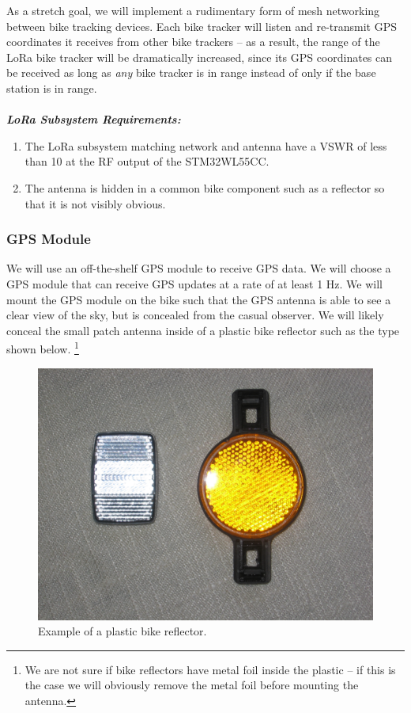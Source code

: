 \documentclass{article}
\begin{document}
As a stretch goal, we will implement a rudimentary form of mesh networking between bike tracking devices. Each bike tracker will listen and re-transmit GPS coordinates it receives from other bike trackers -- as a result, the range of the LoRa bike tracker will be dramatically increased, since its GPS coordinates can be received as long as \textit{any} bike tracker is in range instead of only if the base station is in range. 
\paragraph{} 


\textit{\textbf{LoRa Subsystem Requirements:}}

\begin{enumerate}
	\item The LoRa subsystem matching network and antenna have a VSWR of less than 10 at the RF output of the STM32WL55CC. 
	\item The antenna is hidden in a common bike component such as a reflector so that it is not visibly obvious. 
\end{enumerate}



\subsubsection{GPS Module}

We will use an off-the-shelf GPS module to receive GPS data. We will choose a GPS module that can receive GPS updates at a rate of at least 1 Hz. We will mount the GPS module on the bike such that the GPS antenna is able to see a clear view of the sky, but is concealed from the casual observer. We will likely conceal the small patch antenna inside of a plastic bike reflector such as the type shown below. \footnote{We are not sure if bike reflectors have metal foil inside the plastic -- if this is the case we will obviously remove the metal foil before mounting the antenna.}

\begin{center}
\begin{figure}[H]
	\centering
	\includegraphics[width=0.25 \textwidth]{bike_reflector.jpg}
	\caption{Example of a plastic bike reflector.} \label{reflector}
\end{figure}
\end{center}
\end{document}
